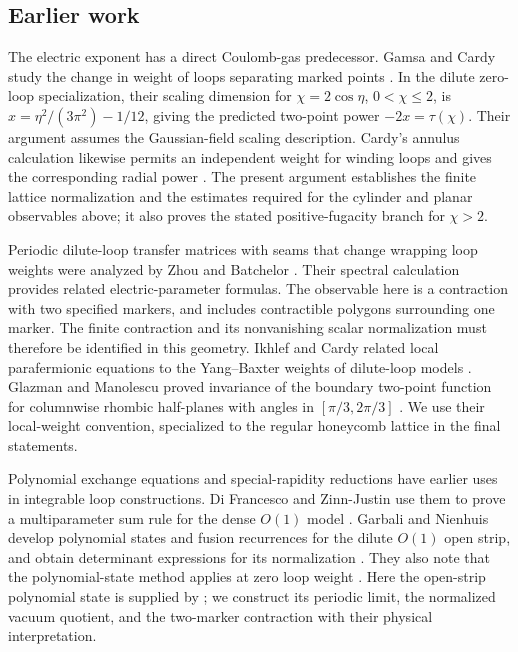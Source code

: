 \subsection{Earlier work}

The electric exponent has a direct Coulomb-gas predecessor. Gamsa and
Cardy study the change in weight of loops separating marked points
\cite[Section~3, equation~(6)]{GamsaCardy2006}. In the dilute
zero-loop specialization, their scaling dimension for
$\chi=2\cos\eta$, $0<\chi\le2$, is
$x=\eta^2/(3\pi^2)-1/12$, giving the predicted two-point power
$-2x=\tau(\chi)$. Their argument assumes the Gaussian-field scaling
description. Cardy's annulus calculation likewise permits an independent
weight for winding loops and gives the corresponding radial power
\cite{Cardy2006Annulus}. The present argument establishes the finite
lattice normalization and the estimates required for the cylinder and
planar observables above; it also proves the stated positive-fugacity
branch for $\chi>2$.

Periodic dilute-loop transfer matrices with seams that change wrapping
loop weights were analyzed by Zhou and Batchelor
\cite{ZhouBatchelor1997}. Their spectral calculation provides related
electric-parameter formulas. The observable here is a contraction with
two specified markers, and includes contractible polygons surrounding
one marker. The finite contraction and its nonvanishing scalar
normalization must therefore be identified in this geometry.
Ikhlef and Cardy related local parafermionic equations to the
Yang--Baxter weights of dilute-loop models \cite{IkhlefCardy2009}.
Glazman and Manolescu proved invariance of the boundary two-point
function for columnwise rhombic half-planes with angles in
$[\pi/3,2\pi/3]$ \cite{GM2019}. We use their local-weight convention,
specialized to the regular honeycomb lattice in the final statements.

Polynomial exchange equations and special-rapidity reductions have
earlier uses in integrable loop constructions. Di Francesco and
Zinn-Justin use them to prove a multiparameter sum rule for the dense
$O(1)$ model \cite{DiFrancescoZinnJustin2005}. Garbali and Nienhuis
develop polynomial states and fusion recurrences for the dilute
$O(1)$ open strip, and obtain determinant expressions for its
normalization \cite{GarbaliNienhuis2017Ground,GarbaliNienhuis2017Sum}.
They also note that the polynomial-state method applies at zero loop
weight \cite[Section~4]{GarbaliNienhuis2017Ground}. Here the
open-strip polynomial state is supplied by \cite{StripCompanion};
we construct its periodic limit, the normalized vacuum quotient,
and the two-marker contraction with their physical interpretation.

